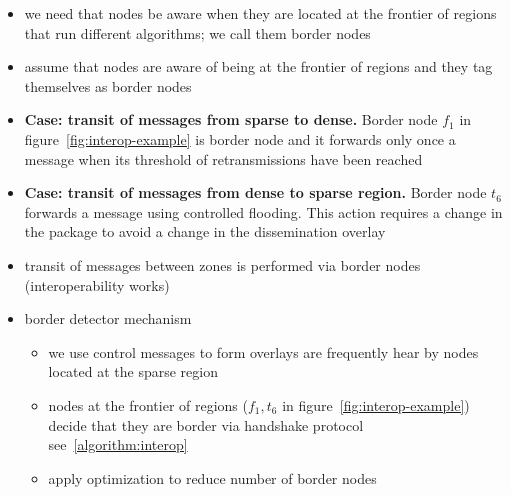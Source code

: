 \begin{itemize}

	\item we need that nodes be aware when they are located at the frontier of regions that run different algorithms; we call them border nodes
	
	\item assume that nodes are aware of being at the frontier of regions and they tag themselves as border nodes
	
	\item \textbf{Case: transit of messages from sparse to dense.} Border node $f_{1}$ in figure~\ref{fig:interop-example} is border node and it forwards only once a message when its threshold of retransmissions have been reached
	
	\item \textbf{Case: transit of messages from dense to sparse region.} Border node $t_{6}$ forwards a message using controlled flooding. This action requires a change in the package to avoid a change in the dissemination overlay
	
	\item transit of messages between zones is performed via border nodes (interoperability works)
	
	\item border detector mechanism 

	\begin{itemize}
		\item we use control messages to form overlays are frequently hear by nodes located at the sparse region
		\item nodes at the frontier of regions ($f_{1}, t_{6}$ in figure~\ref{fig:interop-example}) decide that they are border via handshake protocol see~\ref{algorithm:interop}
		\item apply optimization to reduce number of border nodes
	\end{itemize}

\end{itemize}

